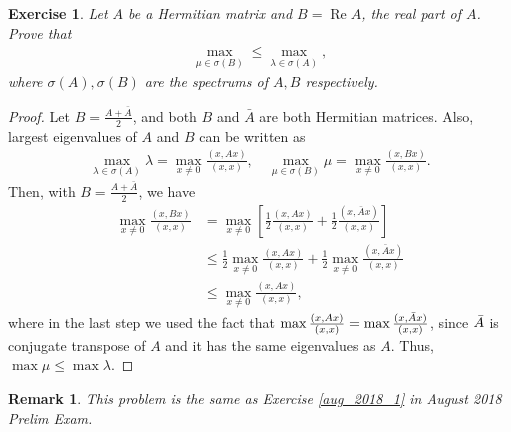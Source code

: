 \documentclass[11pt]{article}
\newtheorem{exercise}{Exercise}[section]
\newtheorem{remark}{Remark}[section]
\theoremstyle{definition}
\numberwithin{equation}{subsection}
\begin{document}
\medskip

\begin{exercise}
Let $A$ be a Hermitian matrix and $B = \operatorname{Re} A$, the real part of $A$. Prove that 
\begin{align*}
    \max_{\mu \in \sigma(B)} \leq \max_{\lambda \in \sigma(A)},
\end{align*}
where $\sigma(A), \sigma(B)$ are the spectrums of $A, B$ respectively.
\end{exercise}
\begin{proof}
Let $B = \frac{A + \bar{A}}{2}$, and both $B$ and $\bar{A}$ are both Hermitian matrices. Also, largest eigenvalues of $A$ and $B$ can be written as
\begin{align*}
    \max_{\lambda \in \sigma(A)} \lambda = \max_{x \neq 0} \frac{(x, Ax)}{(x,x)}, \quad \max_{\mu \in \sigma(B)} \mu = \max_{x \neq 0} \frac{(x, Bx)}{(x,x)}.
\end{align*}
Then, with $B = \frac{A + \bar{A}}{2}$, we have
\begin{align*}
    \max_{x \neq 0} \frac{(x, Bx)}{(x,x)} & = \max_{x \neq 0} \left[\frac{1}{2} \frac{(x, Ax)}{(x,x)} + \frac{1}{2} \frac{(x, \bar{A}x)}{(x,x)} \right] \\
    & \leq \frac{1}{2} \max_{x \neq 0} \frac{(x, Ax)}{(x,x)} + \frac{1}{2} \max_{x \neq 0} \frac{(x, \bar{A}x)}{(x,x)} \\
    & \leq \max_{x \neq 0} \frac{(x, Ax)}{(x,x)},
\end{align*}
where in the last step we used the fact that $\max \frac{(x, Ax)}{(x,x)} = \max \frac{(x, \Bar{A}x)}{(x,x)}$, since $\Bar{A}$ is conjugate transpose of $A$ and it has the same eigenvalues as $A$. Thus, $\max \mu \leq \max \lambda$.
\end{proof}
\begin{remark}
This problem is the same as Exercise \ref{aug_2018_1} in August 2018 Prelim Exam.
\end{remark}

\medskip
\end{document}
